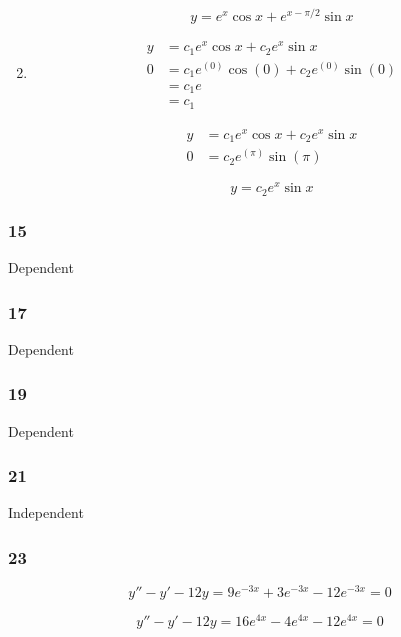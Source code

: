 \documentclass{article}
\begin{document}
\begin{enumerate}
        \[y = e^x \cos x + e^{x - \pi / 2} \sin x\]

  \item

        \begin{align*}
          y & = c_1 e^x \cos x + c_2 e^x \sin x             \\
          0 & = c_1 e^{(0)} \cos (0) + c_2 e^{(0)} \sin (0) \\
            & = c_1 e                                       \\
            & = c_1
        \end{align*}

        \begin{align*}
          y & = c_1 e^x \cos x + c_2 e^x \sin x \\
          0 & = c_2 e^{(\pi)} \sin (\pi)
        \end{align*}

        \[y = c_2 e^x \sin x\]
\end{enumerate}

\subsubsection{15}

Dependent

\subsubsection{17}

Dependent

\subsubsection{19}

Dependent

\subsubsection{21}

Independent

\subsubsection{23}

\[y'' - y' - 12y = 9e^{-3x} + 3e^{-3x} - 12e^{-3x} = 0\]

\[y'' - y' - 12y = 16e^{4x} - 4e^{4x} - 12e^{4x} = 0\]
\end{document}
